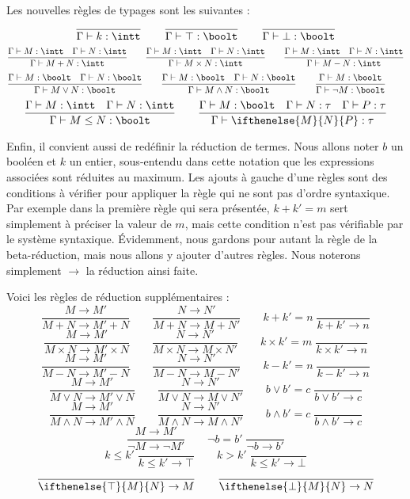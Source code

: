 \begin{defi}[Typage]
    Les nouvelles règles de typages sont les suivantes :
    $$\dfrac{}{\Gamma\vdash k : \intt}\qquad\dfrac{}{\Gamma\vdash \top : \boolt}\qquad\dfrac{}{\Gamma\vdash\bot : \boolt}$$
    $$\dfrac{\Gamma\vdash M : \intt\quad \Gamma\vdash N :\intt}{\Gamma\vdash M+N : \intt}\qquad \dfrac{\Gamma\vdash M : \intt\quad\Gamma\vdash N:\intt}{\Gamma\vdash M\times N : \intt}\qquad \dfrac{\Gamma\vdash M : \intt\quad\Gamma\vdash N:\intt}{\Gamma\vdash M- N : \intt}$$
    $$\dfrac{\Gamma\vdash M :\boolt \quad\Gamma\vdash N : \boolt}{\Gamma\vdash M \lor N : \boolt}\qquad \dfrac{\Gamma\vdash M :\boolt \quad\Gamma\vdash N : \boolt}{\Gamma\vdash M \land N : \boolt}\qquad \dfrac{\Gamma\vdash M :\boolt}{\Gamma\vdash \lnot M : \boolt}\qquad$$
    $$\dfrac{\Gamma\vdash M : \intt\quad \Gamma\vdash N :\intt}{\Gamma\vdash M\leq N : \boolt}\qquad\dfrac{\Gamma\vdash M : \boolt\quad \Gamma\vdash N : \tau\quad \Gamma\vdash P : \tau}{\Gamma\vdash\ifthenelse{M}{N}{P} : \tau}$$
\end{defi}

Enfin, il convient aussi de redéfinir la réduction de termes. Nous allons noter $b$ un booléen et $k$ un entier, sous-entendu dans cette notation que les expressions associées sont réduites au maximum. Les ajouts à gauche d'une règles sont des conditions à vérifier pour appliquer la règle qui ne sont pas d'ordre syntaxique. Par exemple dans la première règle qui sera présentée, $k+k'=m$ sert simplement à préciser la valeur de $m$, mais cette condition n'est pas vérifiable par le système syntaxique. \'Evidemment, nous gardons pour autant la règle de la beta-réduction, mais nous allons y ajouter d'autres règles. Nous noterons simplement $\to$ la réduction ainsi faite.

\begin{defi}[Réduction]
    Voici les règles de réduction supplémentaires :
    $$\dfrac{M\to M'}{M+N \to M' + N}\qquad\dfrac{N \to N'}{M+N\to M+N'}\qquad k+k'=n\;\dfrac{}{k+k'\to n}$$
    $$\dfrac{M\to M'}{M\times N \to M' \times N}\qquad\dfrac{N \to N'}{M\times N\to M\times N'}\qquad k\times k'=m\;\dfrac{}{k\times k'\to n}$$
    $$ \dfrac{M\to M'}{M-N \to M' - N}\qquad\dfrac{N \to N'}{M-N\to M-N'}\qquad k-k'=n\;\dfrac{}{k-k'\to n}$$
    $$\dfrac{M\to M'}{M\lor N \to M' \lor N}\qquad\dfrac{N \to N'}{M\lor N\to M\lor N'}\qquad b\lor b'=c\;\dfrac{}{b\lor b'\to c}$$
    $$\dfrac{M\to M'}{M\land  N \to M' \land  N}\qquad\dfrac{N \to N'}{M\land  N\to M\land  N'}\qquad b\land  b'=c\;\dfrac{}{b\land  b'\to c}$$
    $$\dfrac{M\to M'}{\lnot M\to\lnot M'}\qquad\lnot b = b'\;\dfrac{}{\lnot b\to b'}$$
    $$k\leq k'\;\dfrac{}{k\leq k'\to \top}\qquad k>k'\;\dfrac{}{k\leq k' \to\bot} $$
    $$\dfrac{}{\ifthenelse{\top}{M}{N}\to M}\qquad\dfrac{}{\ifthenelse{\bot}{M}{N}\to N}$$
\end{defi}

